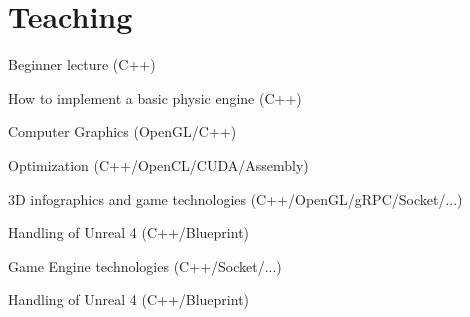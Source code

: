 \documentclass[a4paper]{deedy-resume} %
\begin{document}
\newpage %
\bigskip

\begin{minipage}[t]{0.66\textwidth} %


\section{Teaching}


	\vspace{\topsep} %
	\begin{tightitemize}
		\item Beginner lecture (C++)
		\item How to implement a basic physic engine (C++)
		\item Computer Graphics (OpenGL/C++)
		\item Optimization (C++/OpenCL/CUDA/Assembly)
	\end{tightitemize}

\sectionspace


	\begin{tightitemize}
		\item 3D infographics and game technologies (C++/OpenGL/gRPC/Socket/...)
		\item Handling of Unreal 4 (C++/Blueprint)
	\end{tightitemize}

\sectionspace


	\begin{tightitemize}
		\item Game Engine technologies (C++/Socket/...)
		\item Handling of Unreal 4 (C++/Blueprint)
	\end{tightitemize}


\end{minipage}
\end{document}
